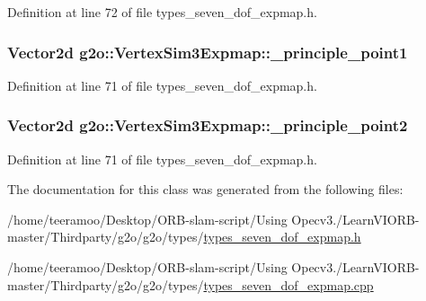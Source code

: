 Definition at line 72 of file types\+\_\+seven\+\_\+dof\+\_\+expmap.\+h.

\subsubsection[{\texorpdfstring{\+\_\+principle\+\_\+point1}{_principle_point1}}]{\setlength{\rightskip}{0pt plus 5cm}Vector2d g2o\+::\+Vertex\+Sim3\+Expmap\+::\+\_\+principle\+\_\+point1}\hypertarget{classg2o_1_1VertexSim3Expmap_a0bf270a1f6d9f45e5b1ee683d4877e1d}{}\label{classg2o_1_1VertexSim3Expmap_a0bf270a1f6d9f45e5b1ee683d4877e1d}


Definition at line 71 of file types\+\_\+seven\+\_\+dof\+\_\+expmap.\+h.

\subsubsection[{\texorpdfstring{\+\_\+principle\+\_\+point2}{_principle_point2}}]{\setlength{\rightskip}{0pt plus 5cm}Vector2d g2o\+::\+Vertex\+Sim3\+Expmap\+::\+\_\+principle\+\_\+point2}\hypertarget{classg2o_1_1VertexSim3Expmap_aae09e8dc5707e524901e49af4d022edb}{}\label{classg2o_1_1VertexSim3Expmap_aae09e8dc5707e524901e49af4d022edb}


Definition at line 71 of file types\+\_\+seven\+\_\+dof\+\_\+expmap.\+h.



The documentation for this class was generated from the following files\+:\begin{DoxyCompactItemize}
\item 
/home/teeramoo/\+Desktop/\+O\+R\+B-\/slam-\/script/\+Using Opecv3./\+Learn\+V\+I\+O\+R\+B-\/master/\+Thirdparty/g2o/g2o/types/\hyperlink{types__seven__dof__expmap_8h}{types\+\_\+seven\+\_\+dof\+\_\+expmap.\+h}\item 
/home/teeramoo/\+Desktop/\+O\+R\+B-\/slam-\/script/\+Using Opecv3./\+Learn\+V\+I\+O\+R\+B-\/master/\+Thirdparty/g2o/g2o/types/\hyperlink{types__seven__dof__expmap_8cpp}{types\+\_\+seven\+\_\+dof\+\_\+expmap.\+cpp}\end{DoxyCompactItemize}
